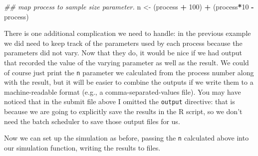 \documentclass[
]{book}
\newenvironment{Shaded}{\begin{snugshade}}{\end{snugshade}}
\newcommand{\CommentTok}[1]{\textcolor[rgb]{0.56,0.35,0.01}{\textit{#1}}}
\newcommand{\ControlFlowTok}[1]{\textcolor[rgb]{0.13,0.29,0.53}{\textbf{#1}}}
\newcommand{\DataTypeTok}[1]{\textcolor[rgb]{0.13,0.29,0.53}{#1}}
\newcommand{\DecValTok}[1]{\textcolor[rgb]{0.00,0.00,0.81}{#1}}
\newcommand{\KeywordTok}[1]{\textcolor[rgb]{0.13,0.29,0.53}{\textbf{#1}}}
\newcommand{\NormalTok}[1]{#1}
\newcommand{\OperatorTok}[1]{\textcolor[rgb]{0.81,0.36,0.00}{\textbf{#1}}}
\newcommand{\StringTok}[1]{\textcolor[rgb]{0.31,0.60,0.02}{#1}}
\begin{document}
\begin{enumerate}
\begin{Shaded}
\begin{Highlighting}[]
\CommentTok{\#\# map process to sample size parameter.}
\NormalTok{n \textless{}{-}}\StringTok{ }\NormalTok{(process }\OperatorTok{+}\StringTok{ }\DecValTok{100}\NormalTok{) }\OperatorTok{+}\StringTok{ }\NormalTok{(process}\OperatorTok{*}\DecValTok{10} \OperatorTok{{-}}\StringTok{ }\NormalTok{process)}
\end{Highlighting}
\end{Shaded}

  There is one additional complication we need to handle: in the
  previous example we did need to keep track of the parameters used by
  each process because the parameters did not vary. Now that they do,
  it would be nice if we had output that recorded the value of the
  varying parameter as well as the result. We could of course just
  print the \texttt{n} parameter we calculated from the process number along
  with the result, but it will be easier to combine the outputs if we
  write them to a machine-readable format (e.g., a
  comma-separated-values file). You may have noticed that in the
  submit file above I omitted the \texttt{output} directive: that is because
  we are going to explicitly save the results in the R script, so we
  don't need the batch scheduler to save those output files for us.

  Now we can set up the simulation as before, passing the \texttt{n}
  calculated above into our simulation function, writing the results
  to files.

\begin{Shaded}
\end{Shaded}
\end{enumerate}
\end{document}
